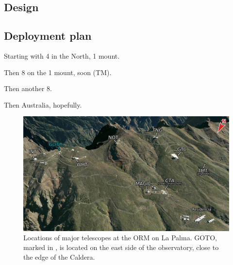 \begin{colsection}

\subsection{Design}
\label{sec:goto_design}
\begin{colsection}


\end{colsection}


\newpage
\subsection{Deployment plan}
\label{sec:goto_expansion}
\begin{colsection}


Starting with 4 in the North, 1 mount.

Then 8 on the 1 mount, soon (TM).

Then another 8.

Then Australia, hopefully.

\newpage

\begin{figure}[p]
    \begin{center}
        \includegraphics[width=\linewidth]{images/orm_labelled.png}
    \end{center}
    \caption[Locations of major telescopes on La Palma]{
        Locations of major telescopes at the ORM on La Palma. GOTO, marked in , is located on the east side of the observatory, close to the edge of the Caldera.
    }\label{fig:orm}
\end{figure}


\end{colsection}
\end{colsection}

